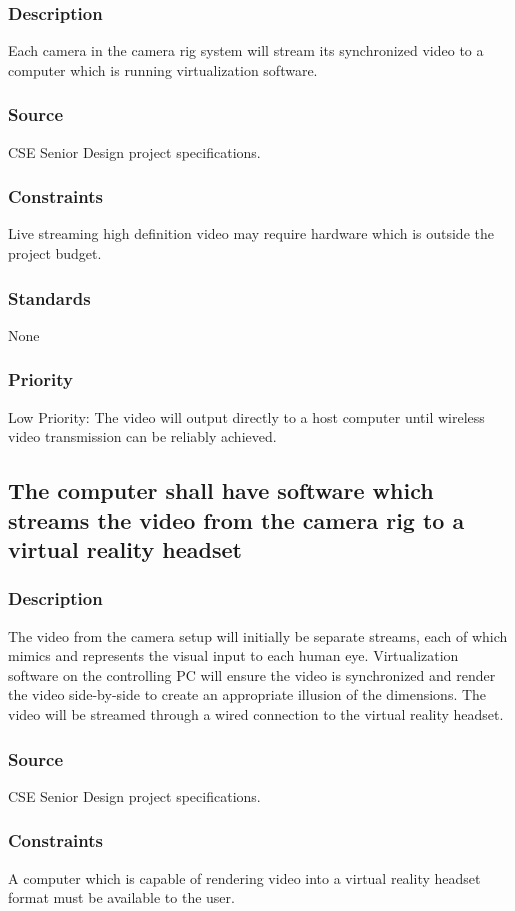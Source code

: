 \subsubsection{Description}
Each camera in the camera rig system will stream its synchronized video to a computer which is running virtualization software. 
\subsubsection{Source}
CSE Senior Design project specifications.
\subsubsection{Constraints}
Live streaming high definition video may require hardware which is outside the project budget.
\subsubsection{Standards}
None
\subsubsection{Priority}
Low Priority: The video will output directly to a host computer until wireless video transmission can be reliably achieved.

\subsection{The computer shall have software which streams the video from the camera rig to a virtual reality headset}
\subsubsection{Description}
The video from the camera setup will initially be separate streams, each of which mimics and represents the visual input to each human eye. Virtualization software on the controlling PC will ensure the video is synchronized and render the video side-by-side to create an appropriate illusion of the dimensions. The video will be streamed through a wired connection to the virtual reality headset.
\subsubsection{Source}
CSE Senior Design project specifications.
\subsubsection{Constraints}
A computer which is capable of rendering video into a virtual reality headset format must be available to the user.
